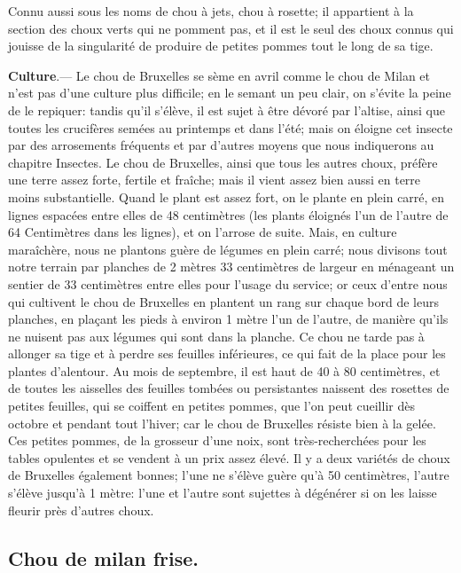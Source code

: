\documentclass[10pt,a4paper]{book}
\begin{document}
Connu aussi sous les noms de chou à jets, chou à rosette; il appartient à la section des choux verts qui ne pomment pas, et il est le seul des choux connus qui jouisse de la singularité de produire de petites pommes tout le long de sa tige.

\textbf{Culture}.--- Le chou de Bruxelles se sème en avril comme le chou de Milan et n'est pas d'une culture plus difficile; en le semant un peu clair, on s'évite la peine de le repiquer: tandis qu'il s'élève, il est sujet à être dévoré par l'altise, ainsi que toutes les crucifères semées au printemps et dans l'été; mais on éloigne cet insecte par des arrosements fréquents et par d'autres moyens que nous indiquerons au chapitre Insectes. Le chou de Bruxelles, ainsi que tous les autres choux, préfère une terre assez forte, fertile et fraîche; mais il vient assez bien aussi en terre moins substantielle. Quand le plant est assez fort, on le plante en plein carré, en lignes espacées entre elles de 48 centimètres (les plants éloignés l'un de l'autre de 64 Centimètres dans les lignes), et on l'arrose de suite. Mais, en culture maraîchère, nous ne plantons guère de légumes en plein carré; nous divisons tout notre terrain par planches de 2 mètres 33 centimètres de largeur en ménageant un sentier de 33 centimètres entre elles pour l'usage du service; or ceux d'entre nous qui cultivent le chou de Bruxelles en plantent un rang sur chaque bord de leurs planches, en plaçant les pieds à environ 1 mètre l'un de l'autre, de manière qu'ils ne nuisent pas aux légumes qui sont dans la planche. Ce chou ne tarde pas à allonger sa tige et à perdre ses feuilles inférieures, ce qui fait de la place pour les plantes d'alentour. Au mois de septembre, il est haut de 40 à 80 centimètres, et de toutes les aisselles des feuilles tombées ou persistantes naissent des rosettes de petites feuilles, qui se coiffent en petites pommes, que l'on peut cueillir dès octobre et pendant tout l'hiver; car le chou de Bruxelles résiste bien à la gelée. Ces petites pommes, de la grosseur d'une noix, sont très-recherchées pour les tables opulentes et se vendent à un prix assez élevé. Il y a deux variétés de choux de Bruxelles également bonnes; l'une ne s'élève guère qu'à 50 centimètres, l'autre s'élève jusqu'à 1 mètre: l'une et l'autre sont sujettes à dégénérer si on les laisse fleurir près d'autres choux.

\subsection{Chou de milan frise.}
\end{document}
